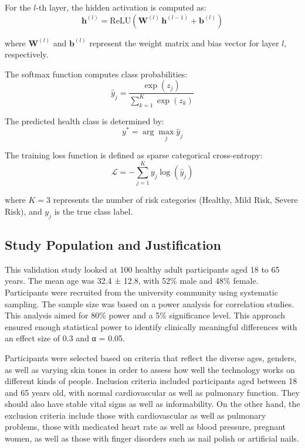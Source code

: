 \documentclass{ieeeaccess}
\begin{document}
For the $l$-th layer, the hidden activation is computed as:
\begin{equation}
\mathbf{h}^{(l)} = \text{ReLU}\left(\mathbf{W}^{(l)}\,\mathbf{h}^{(l-1)} + \mathbf{b}^{(l)}\right)
\end{equation}

where $\mathbf{W}^{(l)}$ and $\mathbf{b}^{(l)}$ represent the weight matrix and bias vector for layer $l$, respectively.

The softmax function computes class probabilities:
\begin{equation}
\hat{y}_j = \frac{\exp(z_j)}{\sum_{k=1}^{K} \exp(z_k)}
\end{equation}

The predicted health class is determined by:
\begin{equation}
y^* = \arg\max_{j} \hat{y}_j
\end{equation}

The training loss function is defined as sparse categorical cross-entropy:
\begin{equation}
\mathcal{L} = -\sum_{j=1}^{K} y_j \log(\hat{y}_j)
\end{equation}

where $K=3$ represents the number of risk categories (Healthy, Mild Risk, Severe Risk), and $y_j$ is the true class label.


\subsection{Study Population and Justification}
This validation study looked at 100 healthy adult participants aged 18 to 65 years. The mean age was 32.4 ± 12.8, with 52\% male and 48\% female. Participants were recruited from the university community using systematic sampling. The sample size was based on a power analysis for correlation studies. This analysis aimed for 80\% power and a 5\% significance level. This approach ensured enough statistical power to identify clinically meaningful differences with an effect size of 0.3 and α = 0.05.

Participants were selected based on criteria that reflect the diverse ages, genders, as well as varying skin tones in order to assess how well the technology works on different kinds of people. Inclusion criteria included participants aged between 18 and 65 years old, with normal cardiovascular as well as pulmonary function. They should also have stable vital signs as well as informability. On the other hand, the exclusion criteria include those with cardiovascular as well as pulmonary problems, those with medicated heart rate as well as blood pressure, pregnant women, as well as those with finger disorders such as nail polish or artificial nails.
\end{document}
